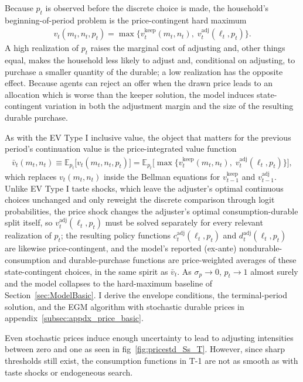 Because $p_t$ is observed before the discrete choice is made, the household's beginning-of-period problem is the price-contingent hard maximum
\begin{align}
	v_t(m_t,n_t,p_t) = \max\Big\{ v_t^{\text{keep}}(m_t,n_t),\; v_t^{\text{adj}}(\ell_t,p_t)\Big\}. \label{eq:price_discrete}
\end{align}
A high realization of $p_t$ raises the marginal cost of adjusting and, other things equal, makes the household less likely to adjust and, conditional on adjusting, to purchase a smaller quantity of the durable; a low realization has the opposite effect. Because agents can reject an offer when the drawn price leads to an allocation which is worse than the keeper solution, the model induces state-contingent variation in both the adjustment margin and the size of the resulting durable purchase.

As with the EV Type I inclusive value, the object that matters for the previous period's continuation value is the price-integrated value function
\begin{align}
	\bar v_t(m_t,n_t) \equiv \mathbb{E}_{p_t}\Big[v_t(m_t,n_t,p_t)\Big]
	= \mathbb{E}_{p_t}\Big[\max\big\{ v_t^{\text{keep}}(m_t,n_t),\; v_t^{\text{adj}}(\ell_t,p_t) \big\}\Big], \label{eq:price_barv}
\end{align}
which replaces $v_t(m_t,n_t)$ inside the Bellman equations for $v_{t-1}^{\text{keep}}$ and $v_{t-1}^{\text{adj}}$. Unlike EV Type I taste shocks, which leave the adjuster's optimal continuous choices unchanged and only reweight the discrete comparison through logit probabilities, the price shock changes the adjuster's optimal consumption-durable split itself, so $v_t^{\text{adj}}(\ell_t,p_t)$ must be solved separately for every relevant realization of $p_t$; the resulting policy functions $c_t^{\text{adj}}(\ell_t,p_t)$ and $d_t^{\text{adj}}(\ell_t,p_t)$ are likewise price-contingent, and the model's reported (ex-ante) nondurable-consumption and durable-purchase functions are price-weighted averages of these state-contingent choices, in the same spirit as $\bar v_t$. As $\sigma_p \to 0$, $p_t \to 1$ almost surely and the model collapses to the hard-maximum baseline of Section~\ref{sec:ModelBasic}. I derive the envelope conditions, the terminal-period solution, and the EGM algorithm with stochastic durable prices in appendix~\ref{subsec:appdx_price_basic}.

Even stochastic prices induce enough uncertainty to lead to adjusting intensities between zero and one as seen in
fig~\ref{fig:pricestd_Ss_T}. However, since sharp thresholds still exist, the consumption functions in T-1 are not as smooth as with taste shocks or endogeneous search.


